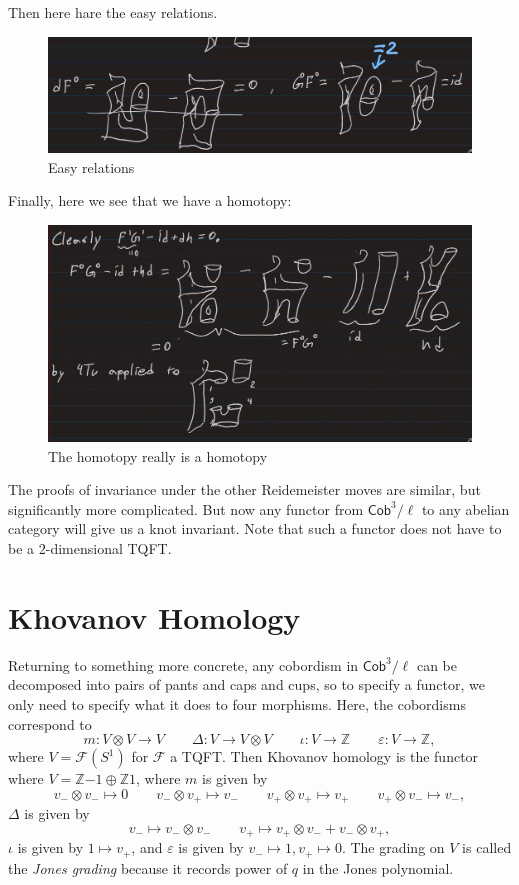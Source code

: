 \documentclass[leqno, openany]{memoir}
\theoremstyle{definition}
\theoremstyle{remark}
\theoremstyle{plain}
\theoremstyle{definition}
\theoremstyle{remark}
\newcommand{\Z}{\mathbb{Z}}
\newcommand{\ep}{\varepsilon}
\newcommand{\mc}[1]{\mathcal{#1}}
\newcommand{\ms}[1]{\mathsf{#1}}
\newcommand{\1}{\mathbf{1}}
\newcommand{\2}{\mathbf{2}}
\newcommand{\3}{\mathbf{3}}
\begin{document}
Then here hare the easy relations.

\begin{figure}[H]
    \centering
    \includegraphics[width=0.8\linewidth]{seb7.png}
    \caption{Easy relations}%
    \label{fig:seb5}
\end{figure}

Finally, here we see that we have a homotopy:

\begin{figure}[H]
    \centering
    \includegraphics[width=0.8\linewidth]{seb8.png}
    \caption{The homotopy really is a homotopy}%
    \label{fig:seb6}
\end{figure}

The proofs of invariance under the other Reidemeister moves are similar, but significantly more complicated. But now any functor from $\ms{Cob}^3/\ell$ to any abelian category will give us a knot invariant. Note that such a functor does not have to be a $2$-dimensional TQFT.

\section{Khovanov Homology}%
\label{sec:khovanov_homology}

Returning to something more concrete, any cobordism in $\ms{Cob}^3/\ell$ can be decomposed into pairs of pants and caps and cups, so to specify a functor, we only need to specify what it does to four morphisms. Here, the cobordisms correspond to
\[ m \colon V \otimes V \to V \qquad \Delta \colon V \to V \otimes V \qquad \iota \colon V \to \Z \qquad \ep \colon V \to \Z, \]
where $V = \mc{F}(S^1)$ for $\mc{F}$ a TQFT. Then Khovanov homology is the functor where $V = \Z \qty{-1} \oplus \Z \qty{1}$, where $m$ is given by
\[ v_- \otimes v_- \mapsto 0 \qquad v_- \otimes v_+ \mapsto v_- \qquad v_+ \otimes v_+ \mapsto v_+ \qquad v_+ \otimes v_- \mapsto v_- ,\]
$\Delta$ is given by
\[ v_- \mapsto v_- \otimes v_- \qquad v_+ \mapsto v_+ \otimes v_- + v_- \otimes v_+, \]
$\iota$ is given by $1 \mapsto v_+$, and $\ep$ is given by $v_- \mapsto 1, v_+ \mapsto 0$. The grading on $V$ is called the \textit{Jones grading} because it records power of $q$ in the Jones polynomial.
\end{document}
